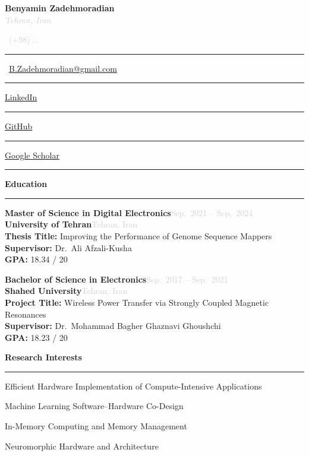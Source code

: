 \documentclass[11pt,a4paper]{article}
\newcommand{\cvsection}[2]{%
  \vspace{0.35cm}%
  \noindent\textcolor{sectiongray}{%
    {\fontsize{11.5pt}{14pt}\selectfont\textbf{#1}}%
    \hspace{0.45em}%
    \textcolor{sectiongray!50}{\rule[0.55ex]{#2\linewidth}{0.45pt}}%
  }%
  \vspace{0.18cm}%
}
\newcommand{\eduentry}[8]{%
  \begingroup
  \fontsize{9pt}{13.5pt}\selectfont
  \textbf{#1}\hfill\textcolor{lightgray}{#2}\\[0.15em]
  \textbf{#3}\hfill\textcolor{lightgray}{#4}\\[0.15em]
  \textbf{#5:} #6\\[0.15em]
  \textbf{Supervisor:} #7\\[0.15em]
  \textbf{GPA:} #8
  \endgroup
}
\begin{document}

\begin{center}
  {\fontsize{22pt}{26pt}\selectfont\bfseries Benyamin Zadehmoradian}\\[0.5em]
  {\fontsize{8.5pt}{12pt}\selectfont\itshape\textcolor{lightgray}{Tehran, Iran}}\\[0.55em]
  {\fontsize{8pt}{12pt}\selectfont
    \textcolor{lightgray}{\Telefon}~\textcolor{lightgray}{(+98)\,...}
    \quad\textcolor{lightgray!60}{\rule{0.45pt}{1.7ex}}\quad
    \Letter~\href{mailto:B.Zadehmoradian@gmail.com}{B.Zadehmoradian@gmail.com}
    \quad\textcolor{lightgray!60}{\rule{0.45pt}{1.7ex}}\quad
    \href{https://www.linkedin.com/in/benyamin-zadehmoradian}{\textcolor{accentblue}{LinkedIn}}
    \quad\textcolor{lightgray!60}{\rule{0.45pt}{1.7ex}}\quad
    \href{https://github.com/BenyaminZadehmoradian}{\textcolor{accentblue}{GitHub}}
    \quad\textcolor{lightgray!60}{\rule{0.45pt}{1.7ex}}\quad
    \href{https://scholar.google.com/citations?user=XXXXXXX}{\textcolor{accentblue}{Google Scholar}}
  }
\end{center}

\vspace{0.1cm}
\noindent\textcolor{lightgray!60}{\rule{\linewidth}{0.4pt}}   %
\vspace{0.05cm}

\cvsection{Education}{0.875}

\footnotesize

\eduentry%
  {Master of Science in Digital Electronics}{Sep.~2021 -- Sep.~2024}%
  {University of Tehran}{Tehran, Iran}%
  {Thesis Title}{Improving the Performance of Genome Sequence Mappers}%
  {Dr.~Ali Afzali-Kusha}{18.34 / 20}

\vspace{0.75em}

\eduentry%
  {Bachelor of Science in Electronics}{Sep.~2017 -- Sep.~2021}%
  {Shahed University}{Tehran, Iran}%
  {Project Title}{Wireless Power Transfer via Strongly Coupled Magnetic Resonances}%
  {Dr.~Mohammad Bagher Ghaznavi Ghoushchi}{18.23 / 20}

\cvsection{Research Interests}{0.795}

\footnotesize
\begin{cvlist}
  \item Efficient Hardware Implementation of Compute-Intensive Applications
  \item Machine Learning Software--Hardware Co-Design
  \item In-Memory Computing and Memory Management
  \item Neuromorphic Hardware and Architecture
\end{cvlist}
\end{document}
